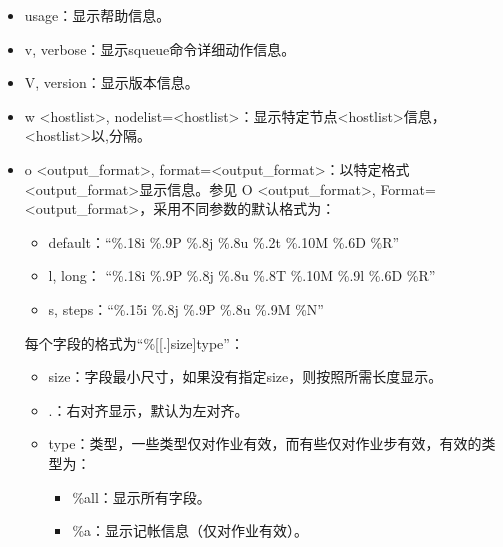 \documentclass[a4paper,12pt,english]{sphinxmanual}
\begin{document}
\begin{itemize}
\item {} 
\sphinxAtStartPar
\sphinxhyphen{}\sphinxhyphen{}usage：显示帮助信息。

\item {} 
\sphinxAtStartPar
\sphinxhyphen{}v, \sphinxhyphen{}\sphinxhyphen{}verbose：显示squeue命令详细动作信息。

\item {} 
\sphinxAtStartPar
\sphinxhyphen{}V, \sphinxhyphen{}\sphinxhyphen{}version：显示版本信息。

\item {} 
\sphinxAtStartPar
\sphinxhyphen{}w <hostlist>, \sphinxhyphen{}\sphinxhyphen{}nodelist=<hostlist>：显示特定节点<hostlist>信息，<hostlist>以,分隔。

\item {} 
\sphinxAtStartPar
\sphinxhyphen{}o <output\_format>, \sphinxhyphen{}\sphinxhyphen{}format=<output\_format>：以特定格式<output\_format>显示信息。参见 \sphinxhyphen{}O <output\_format>, \sphinxhyphen{}\sphinxhyphen{}Format=<output\_format>，采用不同参数的默认格式为：
\begin{itemize}
\item {} 
\sphinxAtStartPar
default：“\%.18i \%.9P \%.8j \%.8u \%.2t \%.10M \%.6D \%R”

\item {} 
\sphinxAtStartPar
\sphinxhyphen{}l, \sphinxhyphen{}\sphinxhyphen{}long： “\%.18i \%.9P \%.8j \%.8u \%.8T \%.10M \%.9l \%.6D \%R”

\item {} 
\sphinxAtStartPar
\sphinxhyphen{}s, \sphinxhyphen{}\sphinxhyphen{}steps：“\%.15i \%.8j \%.9P \%.8u \%.9M \%N”

\end{itemize}

\sphinxAtStartPar
每个字段的格式为“\%{[}{[}.{]}size{]}type”：
\begin{itemize}
\item {} 
\sphinxAtStartPar
size：字段最小尺寸，如果没有指定size，则按照所需长度显示。

\item {} 
\sphinxAtStartPar
.：右对齐显示，默认为左对齐。

\item {} 
\sphinxAtStartPar
type：类型，一些类型仅对作业有效，而有些仅对作业步有效，有效的类型为：
\begin{itemize}
\item {} 
\sphinxAtStartPar
\%all：显示所有字段。

\item {} 
\sphinxAtStartPar
\%a：显示记帐信息（仅对作业有效）。


\end{itemize}
\end{itemize}
\end{itemize}
\end{document}
